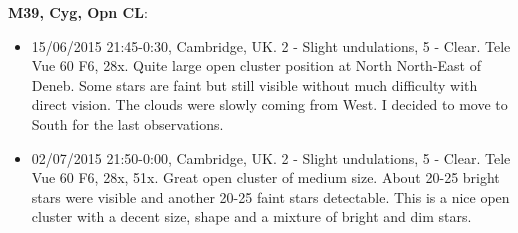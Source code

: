 {\bf M39, Cyg, Opn CL}:
\begin{itemize}
\item 15/06/2015 21:45-0:30, Cambridge, UK. 2 - Slight undulations, 5 - Clear. Tele Vue 60 F6, 28x. Quite large open cluster position at North North-East of Deneb. Some stars are faint but still visible without much difficulty with direct vision. The clouds were slowly coming from West. I decided to move to South for the last observations.
\item 02/07/2015 21:50-0:00, Cambridge, UK. 2 - Slight undulations, 5 - Clear. Tele Vue 60 F6, 28x, 51x. Great open cluster of medium size. About 20-25 bright stars were visible and another 20-25 faint stars detectable. This is a nice open cluster with a decent size, shape and a mixture of bright and dim stars.
\end{itemize}
